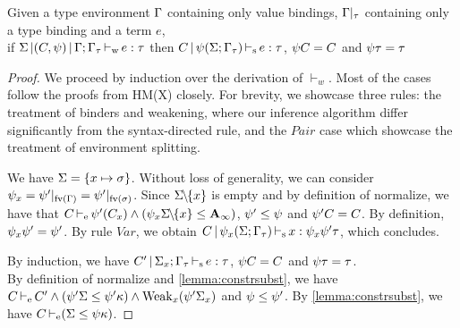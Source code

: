 \begin{theorem}
  Given a type environment $\Gamma$ containing only value bindings,
  $\Gamma|_\tau$ containing only a type binding and a term $e$,\\
  if $\Sigma \operatorname{|} (C,\mathrm{\psi}) \operatorname{|} \Gamma;\Gamma_\tau \operatorname{\vdash_w} e : \tau$
  then $C \operatorname{|} \mathrm{\psi}(\Sigma;\Gamma_\tau) \operatorname{\vdash_s} e : \tau$, $\mathrm{\psi} C = C$ and $\mathrm{\psi} \tau = \tau$
\begin{proof}
  We proceed by induction over the derivation of $\vdash_w$.
  Most of the cases follow the proofs from HM(X) closely.
  For brevity, we showcase three rules: the treatment of binders
  and weakening, where our inference algorithm differ significantly
  from the syntax-directed rule, and the $Pair$ case
  which showcase the treatment of environment splitting.


  We have $\Sigma = \left\{x \mapsto \sigma\right\}$.
  Without loss of generality, we can consider $\mathrm{\psi}_x = \mathrm{\psi}'|_{\operatorname{fv}(\Gamma)} = \mathrm{\psi}'|_{\operatorname{fv}(\sigma)}$.
  Since $\Sigma\!\!\mathbin{\setminus}\!\!\{x\}$ is empty and by definition of normalize, we
  have that
  $C \operatorname{\vdash_e} \mathrm{\psi}'(C_x) \wedge (\mathrm{\psi}_x\Sigma\!\!\mathbin{\setminus}\!\!\{x\} \leq \mathbf{A}_\infty)$,
  $\mathrm{\psi}' \leq \mathrm{\psi}$ and $\mathrm{\psi}'C = C$.
  By definition, $\mathrm{\psi}_x\mathrm{\psi}' = \mathrm{\psi}'$.
  By rule $Var$, we obtain
  $C \operatorname{|} \mathrm{\psi}_x(\Sigma;\Gamma_\tau) \operatorname{\vdash_s} x : \mathrm{\psi}_x\mathrm{\psi}'\tau$, which concludes.
  \\


  By induction, we have
  $C' \operatorname{|} \Sigma_x;\Gamma_\tau \operatorname{\vdash_s} e : \tau$, $\mathrm{\psi} C = C$
  and $\mathrm{\psi} \tau = \tau$.\\
  By definition of normalize and \cref{lemma:constrsubst}, we have
  $C \operatorname{\vdash_e} C'\wedge(\mathrm{\psi}'\Sigma \leq \mathrm{\psi}'\kappa) \wedge \operatorname{Weak}_{x}(\mathrm{\psi}'\Sigma_x)$ and
  $\mathrm{\psi} \leq \mathrm{\psi}'$.
  By \cref{lemma:constrsubst}, we have $C \operatorname{\vdash_e} (\Sigma \leq \mathrm{\psi}\kappa)$.


\end{proof}
\end{theorem}
